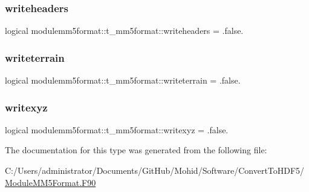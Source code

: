 \subsubsection{\texorpdfstring{writeheaders}{writeheaders}}
{\footnotesize\ttfamily logical modulemm5format\+::t\+\_\+mm5format\+::writeheaders = .false.\hspace{0.3cm}{\ttfamily [private]}}

\mbox{\label{structmodulemm5format_1_1t__mm5format_a529dad13fec89d00c3a47a38da18d246}} 
\subsubsection{\texorpdfstring{writeterrain}{writeterrain}}
{\footnotesize\ttfamily logical modulemm5format\+::t\+\_\+mm5format\+::writeterrain = .false.\hspace{0.3cm}{\ttfamily [private]}}

\mbox{\label{structmodulemm5format_1_1t__mm5format_a64290918df8cb6f59dbd0c075e690cc6}} 
\subsubsection{\texorpdfstring{writexyz}{writexyz}}
{\footnotesize\ttfamily logical modulemm5format\+::t\+\_\+mm5format\+::writexyz = .false.\hspace{0.3cm}{\ttfamily [private]}}



The documentation for this type was generated from the following file\+:\begin{DoxyCompactItemize}
\item 
C\+:/\+Users/administrator/\+Documents/\+Git\+Hub/\+Mohid/\+Software/\+Convert\+To\+H\+D\+F5/\mbox{\hyperlink{_module_m_m5_format_8_f90}{Module\+M\+M5\+Format.\+F90}}\end{DoxyCompactItemize}
